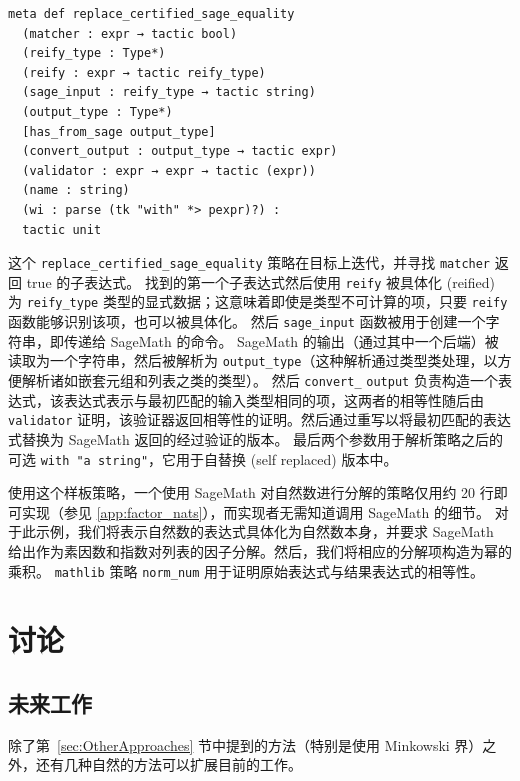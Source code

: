 \documentclass[sigplan,10pt,nonacm,
screen]{acmart} \settopmatter{printfolios=true,printccs=false,printacmref=false}
\newcommand{\mathlib}{\lstinline{mathlib}\xspace}
\begin{document}
\begin{lstlisting}
meta def replace_certified_sage_equality
  (matcher : expr → tactic bool)
  (reify_type : Type*)
  (reify : expr → tactic reify_type)
  (sage_input : reify_type → tactic string)
  (output_type : Type*)
  [has_from_sage output_type]
  (convert_output : output_type → tactic expr)
  (validator : expr → expr → tactic (expr))
  (name : string)
  (wi : parse (tk "with" *> pexpr)?) :
  tactic unit
\end{lstlisting}
这个 \lstinline{replace_certified_sage_equality} 策略在目标上迭代，并寻找 \lstinline{matcher} 返回 true 的子表达式。
找到的第一个子表达式然后使用 \lstinline{reify} 被具体化 (reified) 为 \lstinline{reify_type} 类型的显式数据；这意味着即使是类型不可计算的项，只要 \lstinline{reify} 函数能够识别该项，也可以被具体化。
%
然后 \lstinline{sage_input} 函数被用于创建一个字符串，即传递给 SageMath 的命令。
SageMath 的输出（通过其中一个后端）被读取为一个字符串，然后被解析为 \lstinline{output_type}（这种解析通过类型类处理，以方便解析诸如嵌套元组和列表之类的类型）。
%
然后 \lstinline{convert_}\-%
\lstinline{output} 负责构造一个表达式，该表达式表示与最初匹配的输入类型相同的项，这两者的相等性随后由 \lstinline{validator} 证明，该验证器返回相等性的证明。然后通过重写以将最初匹配的表达式替换为 SageMath 返回的经过验证的版本。
%
最后两个参数用于解析策略之后的可选 \lstinline{with "a string"}，它用于自替换 (self replaced) 版本中。

使用这个样板策略，一个使用 SageMath 对自然数进行分解的策略仅用约 20 行即可实现（参见 \cref{app:factor_nats}），而实现者无需知道调用 SageMath 的细节。
对于此示例，我们将表示自然数的表达式具体化为自然数本身，并要求 SageMath 给出作为素因数和指数对列表的因子分解。然后，我们将相应的分解项构造为幂的乘积。
\mathlib 策略 \lstinline{norm_num} 用于证明原始表达式与结果表达式的相等性。

\section{讨论}

\subsection{未来工作}\label{sec:Future}

除了第~\ref{sec:OtherApproaches} 节中提到的方法（特别是使用 Minkowski 界）之外，还有几种自然的方法可以扩展目前的工作。
\end{document}
